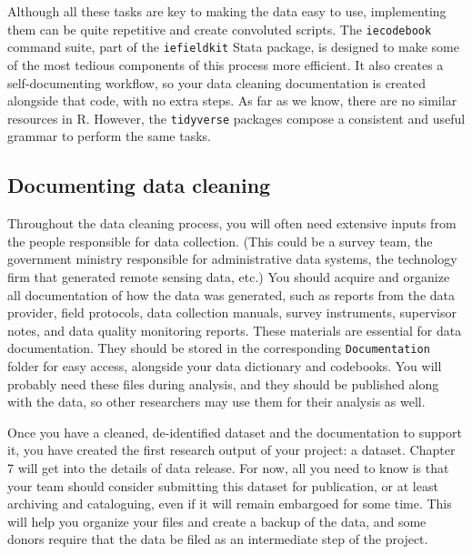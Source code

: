 Although all these tasks are key to making the data easy to use,
implementing them can be quite repetitive and create convoluted scripts.
The \texttt{iecodebook} command suite, part of the \texttt{iefieldkit} Stata package,
is designed to make some of the most tedious components of this process more efficient.
It also creates a self-documenting workflow,
so your data cleaning documentation is created alongside that code,
with no extra steps.
As far as we know, there are no similar resources in R.
However, the \texttt{tidyverse} packages
compose a consistent and useful grammar to perform the same tasks.


\subsection{Documenting data cleaning}
Throughout the data cleaning process,
you will often need extensive inputs from the people responsible for data collection.
(This could be a survey team, the government ministry responsible for administrative data systems,
the technology firm that generated remote sensing data, etc.)
You should acquire and organize all documentation of how the data was generated, such as
reports from the data provider, field protocols, data collection manuals, survey instruments,
supervisor notes, and data quality monitoring reports.
These materials are essential for data documentation.
They should be stored in the corresponding \texttt{Documentation} folder for easy access,
alongside your data dictionary and codebooks.
You will probably need these files during analysis,
and they should be published along with the data,
so other researchers may use them for their analysis as well.

Once you have a cleaned, de-identified dataset and the documentation to support it,
you have created the first research output of your project: a dataset.
Chapter 7 will get into the details of data release.
For now, all you need to know is that your team 
should consider submitting this dataset for publication,
or at least archiving and cataloguing,
even if it will remain embargoed for some time.
This will help you organize your files and create a backup of the data,
and some donors require that the data be filed as an intermediate step of the project.

